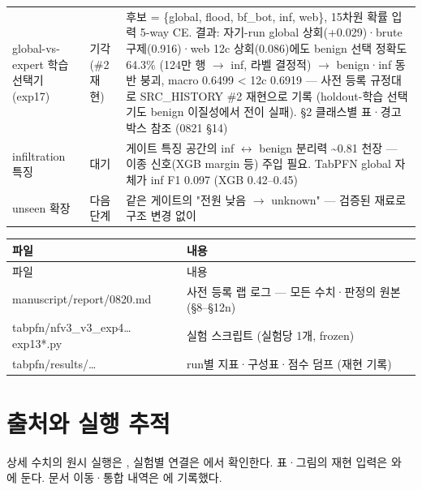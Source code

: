 \begin{longtable}
{}global-vs-expert 학습 선택기 (exp17) & 기각 (\#2 재현) & 후보 =\allowbreak{} \{global, flood, bf\_\allowbreak{}bot, inf, web\}, 15차원 확률 입력 5-way CE. 결과: 자기-run global 상회(+\allowbreak{}0.029)·brute 구제(0.916)·web 12c 상회(0.086)에도 benign 선택 정확도 64.3\% (124만 행  \ensuremath{\rightarrow}  inf, 라벨 결정적)  \ensuremath{\rightarrow}  benign·inf 동반 붕괴, macro 0.6499 < 12c 0.6919 — 사전 등록 규정대로 SRC\_\allowbreak{}HISTORY \#2 재현으로 기록 (holdout-학습 선택기도 benign 이질성에서 전이 실패). §2 클래스별 표·경고 박스 참조 (0821 §14) \\
{}infiltration 특징 & 대기 & 게이트 특징 공간의 inf \ensuremath{\leftrightarrow} benign 분리력 \textasciitilde{}0.81 천장 — 이종 신호(XGB margin 등) 주입 필요. TabPFN global 자체가 inf F1 0.097 (XGB 0.42–0.45) \\
{}unseen 확장 & 다음 단계 & 같은 게이트의 "전원 낮음  \ensuremath{\rightarrow}  unknown" — 검증된 재료로 구조 변경 없이 \\
\bottomrule
\end{longtable}
\endgroup
\begingroup
\footnotesize
\begin{longtable}{>{\raggedright\arraybackslash}p{}>{\raggedright\arraybackslash}p{}}
\toprule
파일 & 내용 \\ \midrule
\endfirsthead
파일 & 내용 \\ \midrule
\endhead
{}manuscript/\allowbreak{}report/\allowbreak{}0820.md & 사전 등록 랩 로그 — 모든 수치·판정의 원본 (§8–§12n) \\
{}tabpfn/\allowbreak{}nfv3\_\allowbreak{}v3\_\allowbreak{}exp4…exp13*.py & 실험 스크립트 (실험당 1개, frozen) \\
{}tabpfn/\allowbreak{}results/\allowbreak{}… & run별 지표·구성표·점수 덤프 (재현 기록) \\
\bottomrule
\end{longtable}
\endgroup


\section*{출처와 실행 추적}

상세 수치의 원시 실행은 , 실험별 연결은 에서 확인한다. 표·그림의 재현 입력은 와 에 둔다. 문서 이동·통합 내역은 에 기록했다.


